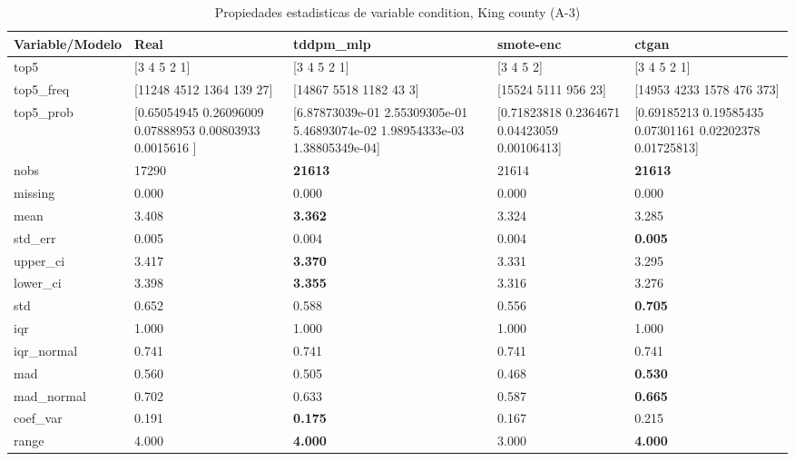 \begin{table}[H]
\centering
\fontsize{8}{14}\selectfont
\caption{Propiedades  estadisticas de variable condition, King county (A-3)}
\label{table-stats-king county-a-3-condition}
\begin{tabular}{|l|m{10em}|m{10em}|m{10em}|m{10em}|}
\hline
 \rowcolor[gray]{0.8}
Variable/Modelo & Real & tddpm\_mlp & smote-enc & ctgan \\
\hline top5 & [3 4 5 2 1] & [3 4 5 2 1] & [3 4 5 2] & [3 4 5 2 1] \\
\hline top5\_freq & [11248  4512  1364   139    27] & [14867  5518  1182    43     3] & [15524  5111   956    23] & [14953  4233  1578   476   373] \\
\hline top5\_prob & [0.65054945 0.26096009 0.07888953 0.00803933 0.0015616 ] & [6.87873039e-01 2.55309305e-01 5.46893074e-02 1.98954333e-03
 1.38805349e-04] & [0.71823818 0.2364671  0.04423059 0.00106413] & [0.69185213 0.19585435 0.07301161 0.02202378 0.01725813] \\
\hline nobs & 17290 & \bfseries 21613 & \cellcolor[rgb]{0.9, 0.54, 0.52} 21614 & \bfseries 21613 \\
\hline missing & 0.000 & 0.000 & 0.000 & 0.000 \\
\hline mean & 3.408 & \bfseries 3.362 & 3.324 & \cellcolor[rgb]{0.9, 0.54, 0.52} 3.285 \\
\hline std\_err & 0.005 & 0.004 & \cellcolor[rgb]{0.9, 0.54, 0.52} 0.004 & \bfseries 0.005 \\
\hline upper\_ci & 3.417 & \bfseries 3.370 & 3.331 & \cellcolor[rgb]{0.9, 0.54, 0.52} 3.295 \\
\hline lower\_ci & 3.398 & \bfseries 3.355 & 3.316 & \cellcolor[rgb]{0.9, 0.54, 0.52} 3.276 \\
\hline std & 0.652 & 0.588 & \cellcolor[rgb]{0.9, 0.54, 0.52} 0.556 & \bfseries 0.705 \\
\hline iqr & 1.000 & 1.000 & 1.000 & 1.000 \\
\hline iqr\_normal & 0.741 & 0.741 & 0.741 & 0.741 \\
\hline mad & 0.560 & 0.505 & \cellcolor[rgb]{0.9, 0.54, 0.52} 0.468 & \bfseries 0.530 \\
\hline mad\_normal & 0.702 & 0.633 & \cellcolor[rgb]{0.9, 0.54, 0.52} 0.587 & \bfseries 0.665 \\
\hline coef\_var & 0.191 & \bfseries 0.175 & \cellcolor[rgb]{0.9, 0.54, 0.52} 0.167 & 0.215 \\
\hline range & 4.000 & \bfseries 4.000 & \cellcolor[rgb]{0.9, 0.54, 0.52} 3.000 & \bfseries 4.000 \\

\end{tabular}
\end{table}
